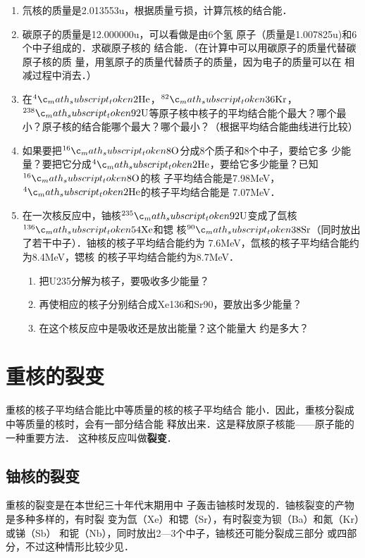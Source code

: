 \begin{enumerate}
    \item 氘核的质量是2.013553u，根据质量亏损，计算氘核的结合能．
    \item 碳原子的质量是12.000000u，可以看做是由6个氢
原子（质量是1.007825u)和6个中子组成的．求碳原子核的
结合能．（在计算中可以用碳原子的质量代替碳原子核的质
量，用氢原子的质量代替质子的质量，因为电子的质量可以在
相减过程中消去．）
\item  在$\atom{He}{4}{2}$，$\atom{Kr}{82}{36}$，$\atom{U}{238}{92}$等原子核中核子的平均结合能个最大？哪个最小？原子核的结合能哪个最大？哪个最小？（根据平均结合能曲线进行比较）
\item 如果要把$\atom{O}{16}{8}$分成8个质子和8个中子，要给它多
少能量？要把它分成$\atom{He}{4}{2}$，要给它多少能量？已知$\atom{O}{16}{8}$的核
子平均结合能是7.98MeV，$\atom{He}{4}{2}$的核子平均结合能是
7.07MeV．
\item 在一次核反应中，铀核$\atom{U}{235}{92}$变成了氙核$\atom{Xe}{136}{54}$和锶
核$\atom{Sr}{90}{38}$（同时放出了若干中子）．铀核的核子平均结合能约为
7.6MeV，氙核的核子平均结合能约为8.4MeV，锶核
的核子平均结合能约为8.7MeV．
\begin{enumerate}
    \item 把U235分解为核子，要吸收多少能量？
    \item 再使相应的核子分别结合成Xe136和Sr90，要放出多少能量？
    \item 在这个核反应中是吸收还是放出能量？这个能量大
约是多大？
\end{enumerate}
\end{enumerate}


\section{重核的裂变}
重核的核子平均结合能比中等质量的核的核子平均结合
能小．因此，重核分裂成中等质量的核时，会有一部分结合能
释放出来．这是释放原子核能——原子能的一种重要方法．
这种核反应叫做\textbf{裂变}．

\subsection{铀核的裂变}

重核的裂变是在本世纪三十年代末期用中
子轰击铀核时发现的．铀核裂变的产物是多种多样的，有时裂
变为氙（Xe）和锶（Sr），有时裂变为钡（Ba）和氮（Kr）或锑（Sb）
和铌（Nb），同时放出2—3个中子，铀核还可能分裂成三部分
或四部分，不过这种情形比较少见．

